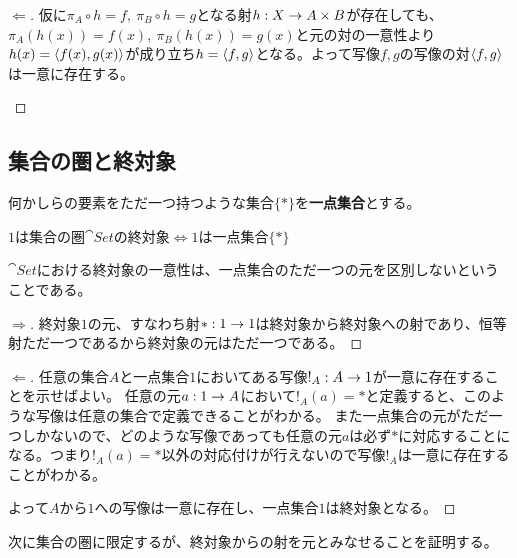 \begin{proof}[$\Longleftarrow$]
		仮に$\pi_A\circ h=f,\ \pi_B\circ h=g$となる射$h:X\rightarrow A\times B$が存在しても、
		$\pi_A(h(x))=f(x),\ \pi_B(h(x))=g(x)$と元の対の一意性より$h(x)=\langle f(x),g(x)\rangle$が成り立ち$h=\langle f,g\rangle$となる。よって写像$f,g$の写像の対$\langle f,g\rangle$は一意に存在する。
		\begin{center}
		\end{center}
	\end{proof}
	
  \subsection{集合の圏と終対象}
	\begin{define}[一点集合]
		何かしらの要素をただ一つ持つような集合$\{*\}$を\textbf{一点集合}とする。
	\end{define}
	\begin{prop}[一点集合と終対象の同値性]
		$1$は集合の圏$\cat{Set}$の終対象$\iff 1$は一点集合$\{*\}$
	\end{prop}
  $\cat{Set}$における終対象の一意性は、一点集合のただ一つの元を区別しないということである。
	\begin{proof}[$\Longrightarrow$]
		終対象$1$の元、すなわち射$*:1\rightarrow 1$は終対象から終対象への射であり、恒等射ただ一つであるから終対象の元はただ一つである。
	\end{proof}
	\begin{proof}[$\Longleftarrow$]
		任意の集合$A$と一点集合$1$においてある写像$!_A:A\rightarrow 1$が一意に存在することを示せばよい。
		任意の元$a:1\rightarrow A$において$!_A(a)=*$と定義すると、このような写像は任意の集合で定義できることがわかる。
		また一点集合の元がただ一つしかないので、どのような写像であっても任意の元$a$は必ず$*$に対応することになる。つまり$!_A(a)=*$以外の対応付けが行えないので写像$!_A$は一意に存在することがわかる。

		よって$A$から$1$への写像は一意に存在し、一点集合$1$は終対象となる。
	\end{proof}
	次に集合の圏に限定するが、終対象からの射を元とみなせることを証明する。

